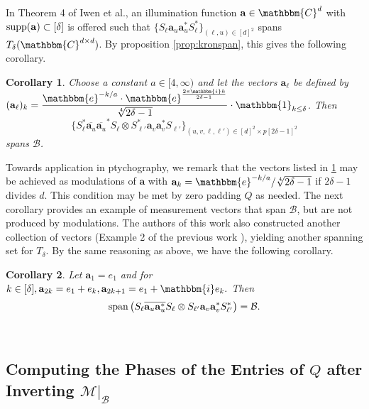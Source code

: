\documentclass[]{spie}  %
\newtheorem{cor}{Corollary}
\def \a {\mathbf a}
\def \bar {\overline}
\def \C {\mathbbm{C}}
\def \B {\mathcal{B}}
\def \e { \mathbbm{e}}
\def \i { \mathbbm{i}}
\def \supp {{\rm supp}}
\def \Span {{\rm span}}
\begin{document}
In Theorem 4 of Iwen et al.\cite{iwen2016fast}, an illumination function $\a \in \C^d$ with $\supp(\a) \subset [\delta]$ is offered such that $\{S_\ell \a_u \a_u^* S_\ell^*\}_{(\ell, u) \in [d]^2}$ spans $T_\delta(\C^{d \times d})$.  By proposition \ref{prop:kronspan}, this gives the following corollary.

\begin{cor}
  Choose a constant $a \in [4, \infty)$ and let the vectors $\a_\ell$ be defined by $(\a_\ell)_k = \dfrac{\e^{-k / a} \cdot \e^{\frac{2 \pi \i k}{2\delta - 1}}}{\sqrt[4]{2 \delta - 1}} \cdot \mathbbm{1}_{k \le \delta}$.  Then $$\{S_\ell^* \bar{\a_u} \bar{\a_u}^* S_\ell \otimes S_{\ell'}^* \a_v \a_v^* S_{\ell'}\}_{(u, v, \ell, \ell') \in [d]^2 \times p[2 \delta - 1]^2}$$ spans $\B$.
      \label{cor:fourier_masks}
\end{cor}

Towards application in ptychography, we remark that the vectors listed in \ref{cor:fourier_masks} may be achieved as modulations of $\a$ with $\a_k = \e^{-k/a} / \sqrt[4]{2 \delta - 1}$ if $2 \delta - 1$ divides $d$.  This condition may be met by zero padding $Q$ as needed.  The next corollary provides an example of measurement vectors that span $\B$, but are not produced by modulations.
The authors of this work  also constructed another collection of vectors (Example 2 of the previous work \cite{iwen2016phase}), yielding another spanning set for $T_\delta$. By the same reasoning as above, we have the following corollary. 
\begin{cor}
  Let $\a_1 = e_1$ and for $k \in [\delta], \a_{2k} = e_1 + e_k, \a_{2k + 1} = e_1 + \i e_k.$  Then $$\Span\left(S_\ell \overline{\a_u \a_{u}^*} S_{\ell} \otimes S_{\ell'} \a_v \a_v^* S_{\ell'}^* \right) = \B.$$ \label{cor:sparse_masks}
\end{cor}

\

\subsection{Computing the Phases of the Entries of $Q$ after Inverting $\mathcal{M} \big|_{\B}$}
\label{sec:Getphases}
\end{document}
